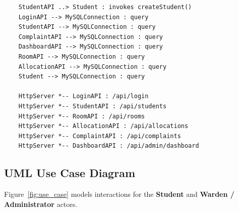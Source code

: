 \documentclass[12pt,a4paper]{article}
\begin{document}
\begin{lstlisting}[style=mermaidstyle, caption={Mermaid UML Class Code from \texttt{class\_diagram.md}}, label={lst:class_mermaid}]
    %% Relationships & Bindings
    StudentAPI ..> Student : invokes createStudent()
    LoginAPI --> MySQLConnection : query
    StudentAPI --> MySQLConnection : query
    ComplaintAPI --> MySQLConnection : query
    DashboardAPI --> MySQLConnection : query
    RoomAPI --> MySQLConnection : query
    AllocationAPI --> MySQLConnection : query
    Student --> MySQLConnection : query

    HttpServer *-- LoginAPI : /api/login
    HttpServer *-- StudentAPI : /api/students
    HttpServer *-- RoomAPI : /api/rooms
    HttpServer *-- AllocationAPI : /api/allocations
    HttpServer *-- ComplaintAPI : /api/complaints
    HttpServer *-- DashboardAPI : /api/admin/dashboard
\end{lstlisting}

\subsection{UML Use Case Diagram}
\label{sec:usecase}
Figure~\ref{fig:use_case} models interactions for the \textbf{Student} and \textbf{Warden / Administrator} actors.
\end{document}
